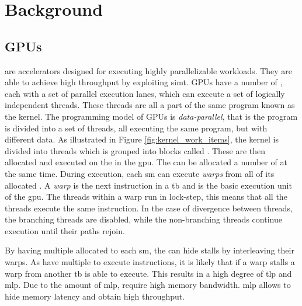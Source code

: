 \chapter{Background}

\section{GPUs}


 are accelerators designed for executing highly parallelizable workloads. They are able to achieve high throughput by exploiting \acrfull{simt}. GPUs have a number of , each with a set of parallel execution lanes, which can execute a set of logically independent threads. These threads are all a part of the same program known as the kernel. The programming model of GPUs is \textit{data-parallel}, that is the program is divided into a set of threads, all executing the same program, but with different data. As illustrated in Figure \ref{fig:kernel_work_items}, the kernel is divided into threads which is grouped into blocks called . These  are then allocated and executed on the  in the \acrshort{gpu}. The  can be allocated a number of  at the same time. During execution, each \acrshort{sm} can execute \textit{warps} from all of its allocated . A \textit{warp} is the next instruction in a \acrshort{tb} and is the basic execution unit of the \acrshort{gpu}. The threads within a warp run in lock-step, this means that all the threads execute the same instruction. In the case of divergence between threads, the branching threads are disabled, while the non-branching threads continue execution until their paths rejoin.

By having multiple  allocated to each \acrshort{sm}, the  can hide stalls by interleaving their warps. As  have multiple  to execute instructions, it is likely that if a warp stalls a warp from another \acrshort{tb} is able to execute. This results in a high degree of \acrfull{tlp} and \acrfull{mlp}. Due to the amount of \acrshort{mlp},  require high memory bandwidth\cite{get_out_of_the_valley}. \acrshort{mlp} allows  to hide memory latency and obtain high throughput.

